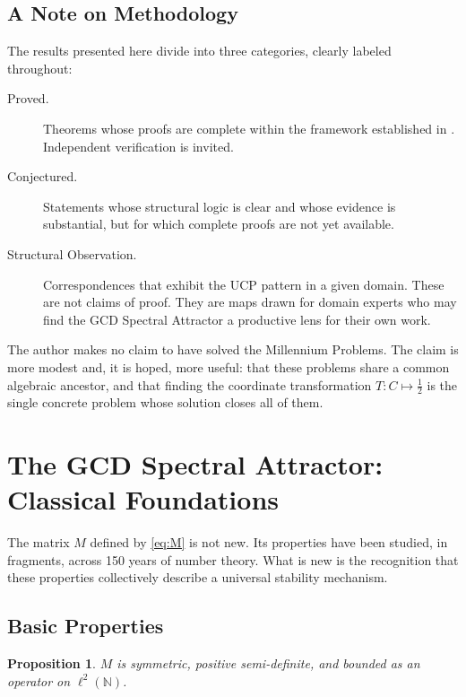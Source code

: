 \documentclass[12pt]{article}
\newtheorem{proposition}[theorem]{Proposition}
\begin{document}
\subsection{A Note on Methodology}

The results presented here divide into three categories, clearly
labeled throughout:

\begin{description}
\item[Proved.] Theorems whose proofs are complete within the
  framework established in \cite{SFE2025, Simons2026a, Simons2026b}.
  Independent verification is invited.

\item[Conjectured.] Statements whose structural logic is clear
  and whose evidence is substantial, but for which complete
  proofs are not yet available.

\item[Structural Observation.] Correspondences that exhibit
  the UCP pattern in a given domain. These are not claims of
  proof. They are maps drawn for domain experts who may find
  the GCD Spectral Attractor a productive lens for their own
  work.
\end{description}

The author makes no claim to have solved the Millennium Problems.
The claim is more modest and, it is hoped, more useful: that
these problems share a common algebraic ancestor, and that
finding the coordinate transformation $T: C \mapsto \tfrac{1}{2}$
is the single concrete problem whose solution closes all of them.

\section{The GCD Spectral Attractor: Classical Foundations}

The matrix $M$ defined by \eqref{eq:M} is not new. Its properties
have been studied, in fragments, across 150 years of number theory.
What is new is the recognition that these properties collectively
describe a universal stability mechanism.

\subsection{Basic Properties}

\begin{proposition}
$M$ is symmetric, positive semi-definite, and bounded as an
operator on $\ell^2(\mathbb{N})$.
\end{proposition}
\end{document}
